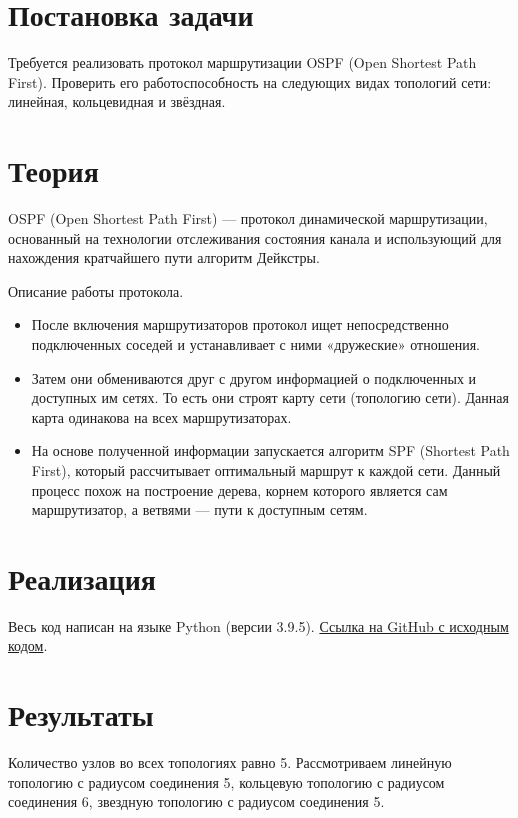 \documentclass[a4paper,12pt]{article}
\begin{document}
    
    \newpage

    \tableofcontents
    \listoffigures
    \listoftables
    \newpage

    \section{Постановка задачи}
    \quad Требуется реализовать протокол маршрутизации OSPF (Open Shortest Path First).
    Проверить его работоспособность на следующих видах топологий сети:
    линейная, кольцевидная и звёздная.

    \section{Теория}
    \quad OSPF (Open Shortest Path First) — протокол динамической маршрутизации,
    основанный на технологии отслеживания состояния канала
    и использующий для нахождения кратчайшего пути алгоритм Дейкстры.

    Описание работы протокола.
    \begin{itemize}
        \item После включения маршрутизаторов протокол ищет непосредственно подключенных соседей
        и устанавливает с ними «дружеские» отношения.
        \item Затем они обмениваются друг с другом информацией о подключенных и доступных им сетях.
        То есть они строят карту сети (топологию сети).
        Данная карта одинакова на всех маршрутизаторах.
        \item На основе полученной информации запускается алгоритм SPF (Shortest Path First),
        который рассчитывает оптимальный маршрут к каждой сети.
        Данный процесс похож на построение дерева, корнем которого является сам маршрутизатор,
        а ветвями — пути к доступным сетям.
    \end{itemize}

    \section{Реализация}
    \quad Весь код написан на языке Python (версии 3.9.5).
    \href{https://github.com/BoIlAl/Networks/tree/master/lab2}{Ссылка на GitHub с исходным кодом}.

    \section{Результаты}
    \quad Количество узлов во всех топологиях равно 5. Рассмотриваем линейную топологию с радиусом соединения 5, кольцевую топологию с радиусом соединения 6, звездную топологию с радиусом соединения 5.
\end{document}
